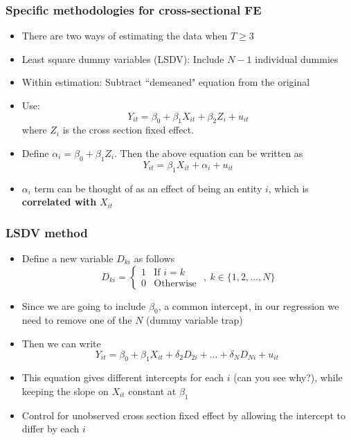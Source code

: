 \documentclass[aspectratio=169]{beamer}
\begin{document}
\begin{frame}
\frametitle{Specific methodologies for cross-sectional FE}
\begin{itemize}
\item There are two ways of estimating the data when $T\geq 3$
\item Least square dummy variables (LSDV): Include $N-1$ individual dummies
\item Within estimation: Subtract ``demeaned" equation from the original
\item Use: 
\[
Y_{it}=\beta_0 + \beta_1X_{it}+\beta_2 Z_{i}+u_{it} \tag{1}
\]
where $Z_i$ is the cross section fixed effect.
\item Define  $\alpha_i = \beta_0 + \beta_1Z_i$. Then the above equation can be written as
\[
Y_{it}=\beta_1X_{it}+\alpha_{i}+u_{it} \tag{2}
\]
\item $\alpha_i$ term can be thought of as an effect of being an entity $i$, which is \textbf{correlated with} $X_{it}$
\end{itemize}
\end{frame}

\begin{frame}
\frametitle{LSDV method}
\begin{itemize}
\item Define a new variable $D_{ki}$ as follows
\[
D_{ki} = \begin{cases} 1 & \text{If $i=k$} \\
                                     0 & \text{Otherwise } \end{cases} , \ k\in\{1,2,...,N\}
\] 
\item Since we are going to include $\beta_0$, a common intercept, in our regression we need to remove one of the $N$ (dummy variable trap)
\item Then we can write
\[
Y_{it} = \beta_0 +\beta_1X_{it}+\delta_2D_{2i} + ... + \delta_ND_{Ni}+u_{it} \ \tag{LSDV}
\]
\item This equation gives different intercepts for each $i$ (can you see why?), while keeping the slope on $X_{it}$ constant at $\beta_1$ 
\item Control for unobserved cross section fixed effect by allowing the intercept to differ by each $i$
\end{itemize}
\end{frame}
\end{document}
